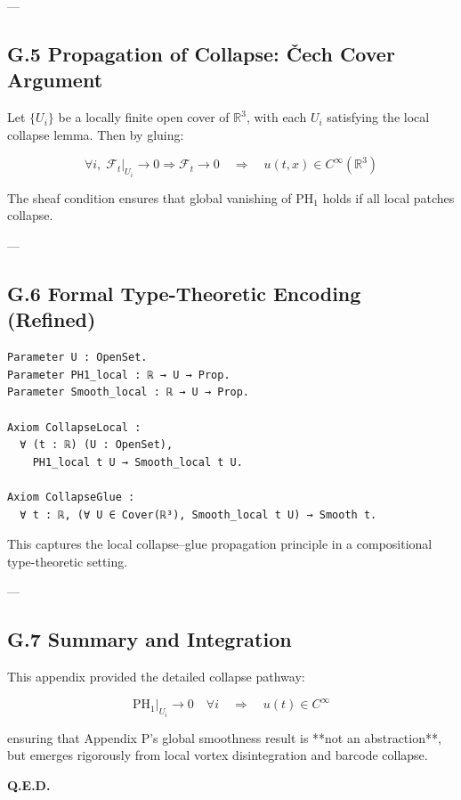 \documentclass[11pt]{article}
\begin{document}
---

\subsection*{G.5 Propagation of Collapse: Čech Cover Argument}

Let \( \{ U_i \} \) be a locally finite open cover of \( \mathbb{R}^3 \), with each \( U_i \) satisfying the local collapse lemma.  
Then by gluing:

\[
\forall i, \; \mathcal{F}_t|_{U_i} \to 0 \Rightarrow \mathcal{F}_t \to 0
\quad \Rightarrow \quad u(t,x) \in C^\infty(\mathbb{R}^3)
\]

The sheaf condition ensures that global vanishing of \( \mathrm{PH}_1 \) holds if all local patches collapse.

---

\subsection*{G.6 Formal Type-Theoretic Encoding (Refined)}

\begin{lstlisting}[language=Coq, caption=Local Collapse Encoding in Type Theory]
Parameter U : OpenSet.
Parameter PH1_local : ℝ → U → Prop.
Parameter Smooth_local : ℝ → U → Prop.

Axiom CollapseLocal :
  ∀ (t : ℝ) (U : OpenSet),
    PH1_local t U → Smooth_local t U.

Axiom CollapseGlue :
  ∀ t : ℝ, (∀ U ∈ Cover(ℝ³), Smooth_local t U) → Smooth t.
\end{lstlisting}

This captures the local collapse–glue propagation principle in a compositional type-theoretic setting.

---

\subsection*{G.7 Summary and Integration}

This appendix provided the detailed collapse pathway:

\[
\mathrm{PH}_1|_{U_i} \to 0 \quad \forall i \quad \Rightarrow \quad u(t) \in C^\infty
\]

ensuring that Appendix P’s global smoothness result is **not an abstraction**,  
but emerges rigorously from local vortex disintegration and barcode collapse.

\begin{flushright}
\textbf{Q.E.D.}
\end{flushright}
\end{document}
